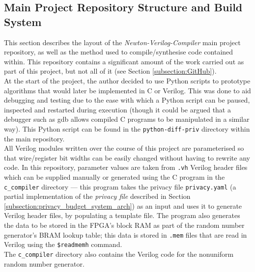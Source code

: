 \documentclass[12pt]{article}
\begin{document}
  \subsection{Main Project Repository Structure and Build System} \label{subsection:build_system}
    This section describes the layout of the \textit{Newton-Verilog-Compiler} main project repository, as well as the method used to compile/synthesise code contained within. This repository contains a significant amount of the work carried out as part of this project, but not all of it (see Section \ref{subsection:GitHub}).\\

    At the start of the project, the author decided to use Python scripts to prototype algorithms that would later be implemented in C or Verilog. This was done to aid debugging and testing due to the ease with which a Python script can be paused, inspected and restarted during execution (though it could be argued that a debugger such as gdb allows compiled C programs to be manipulated in a similar way). This Python script can be found in the \texttt{python-diff-priv} directory within the main repository.\\

    All Verilog modules written over the course of this project are parameterised so that wire/register bit widths can be easily changed without having to rewrite any code. In this repository, parameter values are taken from \texttt{.vh} Verilog header files which can be supplied manually or generated using the C program in the \texttt{c\_compiler} directory --- this program takes the privacy file \texttt{privacy.yaml} (a partial implementation of the \textit{privacy file} described in Section \ref{subsection:privacy_budget_system_arch}) as an input and uses it to generate Verilog header files, by populating a template file. The program also generates the data to be stored in the FPGA's block RAM as part of the random number generator's BRAM lookup table; this data is stored in \texttt{.mem} files that are read in Verilog using the \texttt{\$readmemh} command.\\

    The \texttt{c\_compiler} directory also contains the Verilog code for the nonuniform random number generator.\\
\end{document}
